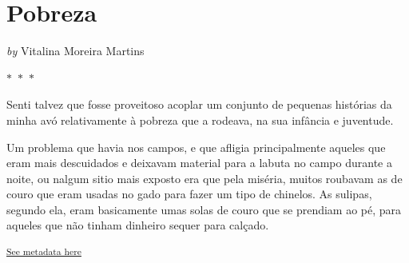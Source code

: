 \documentclass{article}
\begin{document}
\newpage
\section{Pobreza}


    
        \textit{by} Vitalina Moreira Martins
    


 
    

    $\ast$~$\ast$~$\ast$  


    \begin{center}
        \begin{minipage}{0.9\textwidth}
            \setlength{\parskip}{0.2cm}
            \setlength{\parindent}{0cm}
            \fontsize{12pt}{14pt}\selectfont
            


Senti talvez que fosse proveitoso acoplar um conjunto de pequenas
histórias da minha avó relativamente à pobreza que a rodeava, na sua
infância e juventude.

Um problema que havia nos campos, e que afligia principalmente aqueles
que eram mais descuidados e deixavam material para a labuta no campo
durante a noite, ou nalgum sitio mais exposto era que pela miséria,
muitos roubavam as de couro que eram usadas no gado para fazer um tipo de chinelos. As
sulipas, segundo ela, eram basicamente umas solas de couro que se
prendiam ao pé, para aqueles que não tinham dinheiro sequer para
calçado.

        \end{minipage}
    \end{center}

    
        \textsuperscript{\hyperref[table:\arabic{tablecounter}]{See metadata here}}
    
\end{document}
